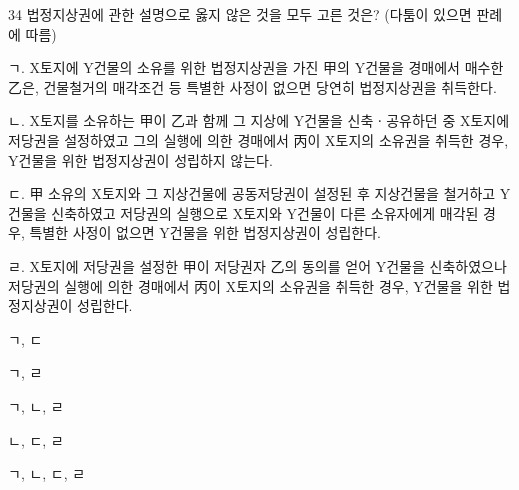 \begin{question}{34}
법정지상권에 관한 설명으로 옳지 않은 것을 모두 고른 것은? (다툼이 있으면 판례에 따름)
\begin{framedtext}
ㄱ. X토지에 Y건물의 소유를 위한 법정지상권을 가진 甲의 Y건물을 경매에서 매수한 乙은, 건물철거의 매각조건 등 특별한 사정이 없으면 당연히 법정지상권을 취득한다. \par
ㄴ. X토지를 소유하는 甲이 乙과 함께 그 지상에 Y건물을 신축ㆍ공유하던 중 X토지에 저당권을 설정하였고 그의 실행에 의한 경매에서 丙이 X토지의 소유권을 취득한 경우, Y건물을 위한 법정지상권이 성립하지 않는다. \par
ㄷ. 甲 소유의 X토지와 그 지상건물에 공동저당권이 설정된 후 지상건물을 철거하고 Y건물을 신축하였고 저당권의 실행으로 X토지와 Y건물이 다른 소유자에게 매각된 경우, 특별한 사정이 없으면 Y건물을 위한 법정지상권이 성립한다. \par
ㄹ. X토지에 저당권을 설정한 甲이 저당권자 乙의 동의를 얻어 Y건물을 신축하였으나 저당권의 실행에 의한 경매에서 丙이 X토지의 소유권을 취득한 경우, Y건물을 위한 법정지상권이 성립한다. \par
\end{framedtext}
\begin{choices}
  \item ㄱ, ㄷ
  \item ㄱ, ㄹ
  \item ㄱ, ㄴ, ㄹ
  \item ㄴ, ㄷ, ㄹ
  \item ㄱ, ㄴ, ㄷ, ㄹ
\end{choices}
\end{question}
